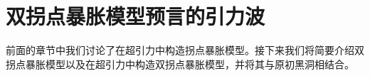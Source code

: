 \chapter{双拐点暴胀模型预言的引力波}

前面的章节中我们讨论了在超引力中构造拐点暴胀模型。接下来我们将简要介绍双拐点暴胀模型以及在超引力中构造双拐点暴胀模型，并将其与原初黑洞相结合。





